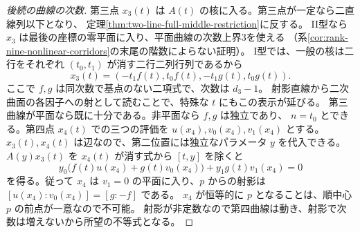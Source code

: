\begin{proof}[後続の曲線の次数]
第三点 $x_3(t)$ は $A(t)$ の核に入る。第三点が一定なら二直線列以下となり、
定理\ref{thm:two-line-full-middle-restriction}に反する。
II型なら $x_3$ は最後の座標の零平面に入り、平面曲線の次数上界3を使える
（系\ref{cor:rank-nine-nonlinear-corridors}の末尾の階数によらない証明）。
I型では、一般の核は二行をそれぞれ $(t_0,t_1)$ が消す二行二列行列であるから
\[
         x_3(t)=(-t_1 f(t),t_0 f(t),-t_1 g(t),t_0 g(t)).
\]
ここで $f,g$ は同次数で基点のない二項式で、次数は $d_3-1$。
射影直線から二次曲面の各因子への射として読むことで、特殊な $t$ にもこの表示が延びる。
第三曲線が平面なら既に十分である。非平面なら $f,g$ は独立であり、
$n=t_0$ とできる。第四点 $x_4(t)$ での三つの評価を $u(x_4),v_0(x_4),v_1(x_4)$ とする。
$x_3(t),x_4(t)$ は辺なので、第二位置には独立なパラメータ $y$ を代入できる。
$A(y)x_3(t)$ を $x_4(t)$ が消す式から $[t,y]$ を除くと
\[
 y_0\big(f(t)u(x_4)+g(t)v_0(x_4)\big)+y_1 g(t)v_1(x_4)=0
\]
を得る。従って $x_4$ は $v_1=0$ の平面に入り、$p$ からの射影は
$[u(x_4):v_0(x_4)]=[g:-f]$ である。
$x_4$ が恒等的に $p$ となることは、順中心 $p$ の前点が一意なので不可能。
射影が非定数なので第四曲線は動き、射影で次数は増えないから所望の不等式となる。
\end{proof}
